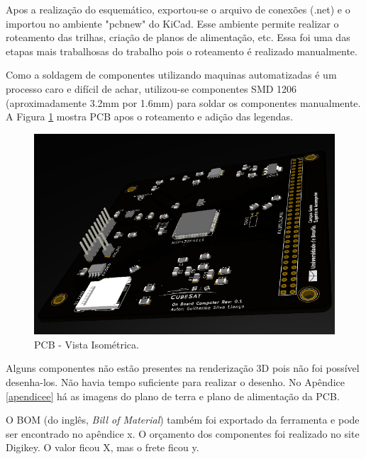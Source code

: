 Apos a realização do esquemático, exportou-se o arquivo de conexões (.net) e o importou no ambiente "pcbnew" do KiCad. Esse ambiente permite realizar o roteamento das trilhas, criação de planos de alimentação, etc. Essa foi uma das etapas mais trabalhosas do trabalho pois o roteamento é realizado manualmente. 

Como a soldagem de componentes utilizando maquinas automatizadas é um processo caro e difícil de achar, utilizou-se componentes SMD 1206 (aproximadamente 3.2mm por 1.6mm) para soldar os componentes manualmente. A Figura \ref{pcb_isoView} mostra PCB apos o roteamento e adição das legendas.

\begin{figure}[h]
	\centering
	\caption{PCB - Vista Isométrica.}
	
	\includegraphics[keepaspectratio=true,scale=0.78]{figuras/pcbRealistic.PNG}
	
	\label{pcb_isoView}
\end{figure}

Alguns componentes não estão presentes na renderização 3D pois não foi possível desenha-los. Não havia tempo suficiente para realizar o desenho. No Apêndice \ref{apendicee} há as imagens do plano de terra e plano de alimentação da PCB.

O BOM (do inglês, \textit{Bill of Material}) também foi exportado da ferramenta e pode ser encontrado no apêndice x. O orçamento dos componentes foi realizado no site Digikey. O valor ficou X, mas o frete ficou y. 


